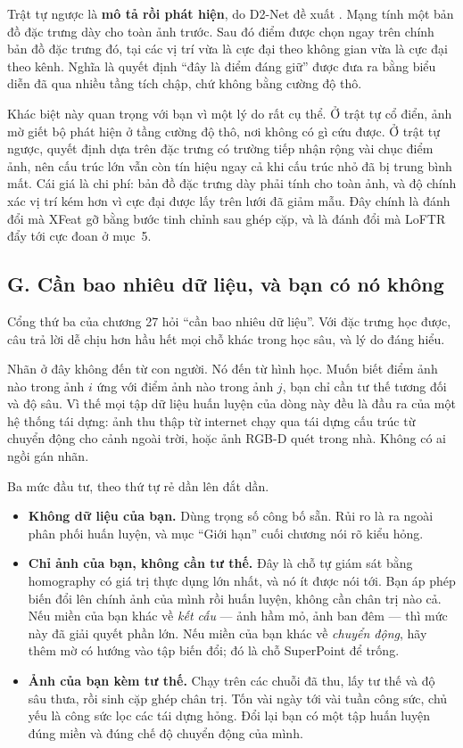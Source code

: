 \documentclass[../../deep_learning.tex]{subfiles}
\begin{document}
Trật tự ngược là \textbf{mô tả rồi phát hiện}, do D2-Net đề xuất \cite{dusmanu2019d2net}. Mạng tính một bản đồ đặc trưng dày cho toàn ảnh trước. Sau đó điểm được chọn ngay trên chính bản đồ đặc trưng đó, tại các vị trí vừa là cực đại theo không gian vừa là cực đại theo kênh. Nghĩa là quyết định ``đây là điểm đáng giữ'' được đưa ra bằng biểu diễn đã qua nhiều tầng tích chập, chứ không bằng cường độ thô.

Khác biệt này quan trọng với bạn vì một lý do rất cụ thể. Ở trật tự cổ điển, ảnh mờ giết bộ phát hiện ở tầng cường độ thô, nơi không có gì cứu được. Ở trật tự ngược, quyết định dựa trên đặc trưng có trường tiếp nhận rộng vài chục điểm ảnh, nên cấu trúc lớn vẫn còn tín hiệu ngay cả khi cấu trúc nhỏ đã bị trung bình mất. Cái giá là chi phí: bản đồ đặc trưng dày phải tính cho toàn ảnh, và độ chính xác vị trí kém hơn vì cực đại được lấy trên lưới đã giảm mẫu. Đây chính là đánh đổi mà XFeat gỡ bằng bước tinh chỉnh sau ghép cặp, và là đánh đổi mà LoFTR đẩy tới cực đoan ở mục~5.

\subsection{G. Cần bao nhiêu dữ liệu, và bạn có nó không}
Cổng thứ ba của chương 27 hỏi ``cần bao nhiêu dữ liệu''. Với đặc trưng học được, câu trả lời dễ chịu hơn hầu hết mọi chỗ khác trong học sâu, và lý do đáng hiểu.

Nhãn ở đây không đến từ con người. Nó đến từ hình học. Muốn biết điểm ảnh nào trong ảnh \(i\) ứng với điểm ảnh nào trong ảnh \(j\), bạn chỉ cần tư thế tương đối và độ sâu. Vì thế mọi tập dữ liệu huấn luyện của dòng này đều là đầu ra của một hệ thống tái dựng: ảnh thu thập từ internet chạy qua tái dựng cấu trúc từ chuyển động cho cảnh ngoài trời, hoặc ảnh RGB-D quét trong nhà. Không có ai ngồi gán nhãn.

Ba mức đầu tư, theo thứ tự rẻ dần lên đắt dần.

\begin{itemize}
\item \textbf{Không dữ liệu của bạn.} Dùng trọng số công bố sẵn. Rủi ro là ra ngoài phân phối huấn luyện, và mục ``Giới hạn'' cuối chương nói rõ kiểu hỏng.
\item \textbf{Chỉ ảnh của bạn, không cần tư thế.} Đây là chỗ tự giám sát bằng homography có giá trị thực dụng lớn nhất, và nó ít được nói tới. Bạn áp phép biến đổi lên chính ảnh của mình rồi huấn luyện, không cần chân trị nào cả. Nếu miền của bạn khác về \emph{kết cấu} --- ảnh hầm mỏ, ảnh ban đêm --- thì mức này đã giải quyết phần lớn. Nếu miền của bạn khác về \emph{chuyển động}, hãy thêm mờ có hướng vào tập biến đổi; đó là chỗ SuperPoint để trống.
\item \textbf{Ảnh của bạn kèm tư thế.} Chạy  trên các chuỗi đã thu, lấy tư thế và độ sâu thưa, rồi sinh cặp ghép chân trị. Tốn vài ngày tới vài tuần công sức, chủ yếu là công sức lọc các tái dựng hỏng. Đổi lại bạn có một tập huấn luyện đúng miền và đúng chế độ chuyển động của mình.
\end{itemize}
\end{document}

